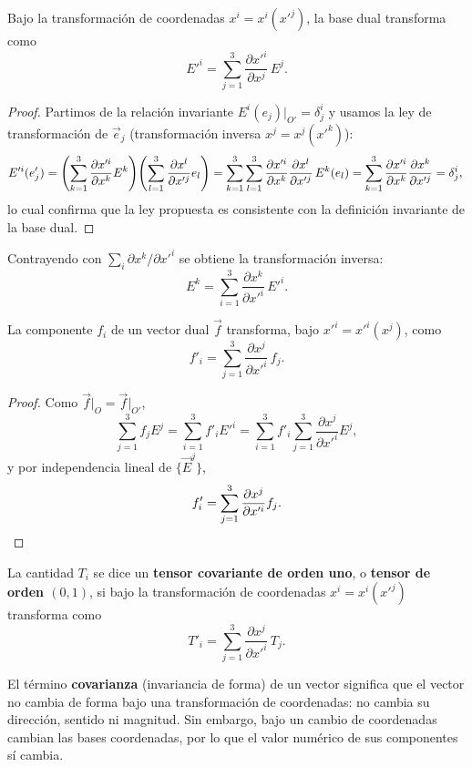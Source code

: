 \begin{proposicionc}
\label{prop:transf-base-dual}
Bajo la transformación de coordenadas $x^i=x^i(x'^j)$, la base dual
transforma como
\[
E'^i = \sum_{j=1}^{3} \frac{\partial x'^i}{\partial x^j}\, E^j .
\]
\end{proposicionc}

\begin{proof}
Partimos de la relación invariante $E^i(e_j)\big|_{O'} = \delta^i_j$ y
usamos la ley de transformación de $\vec e_j$ (transformación inversa
$x^j=x^j(x'^k)$):
\[
E'^i(e'_j) = \left(\sum_{k=1}^3 \frac{\partial x'^i}{\partial x^k} E^k
\right)\!\left(\sum_{l=1}^3 \frac{\partial x^l}{\partial x'^j} e_l\right)
= \sum_{k=1}^3\sum_{l=1}^3 \frac{\partial x'^i}{\partial x^k}
\frac{\partial x^l}{\partial x'^j}\, E^k(e_l)
= \sum_{k=1}^3 \frac{\partial x'^i}{\partial x^k}\frac{\partial
x^k}{\partial x'^j} = \delta^i_j , \qedhere
\]
lo cual confirma que la ley propuesta es consistente con la definición
invariante de la base dual.
\end{proof}

Contrayendo con $\sum_i \partial x^k/\partial x'^i$ se obtiene la
transformación inversa:
\[
E^k = \sum_{i=1}^{3} \frac{\partial x^k}{\partial x'^i}\, E'^i .
\]

\begin{proposicionc}
\label{prop:transf-componentes-dual}
La componente $f_i$ de un vector dual $\vec f$ transforma, bajo
$x'^i=x'^i(x^j)$, como
\[
f'_i = \sum_{j=1}^{3} \frac{\partial x^j}{\partial x'^i}\, f_j .
\]
\end{proposicionc}

\begin{proof}
Como $\vec f\big|_O = \vec f\big|_{O'}$,
\[
\sum_{j=1}^3 f_j E^j = \sum_{i=1}^3 f'_i E'^i = \sum_{i=1}^3 f'_i
\sum_{j=1}^3 \frac{\partial x^j}{\partial x'^i} E^j ,
\]
y por independencia lineal de $\{\vec E^j\}$,
\[
f'_i = \sum_{j=1}^3 \frac{\partial x^j}{\partial x'^i} f_j . \qedhere
\]
\end{proof}

\begin{definicion}
La cantidad $T_i$ se dice un \textbf{tensor covariante de orden uno}, o
\textbf{tensor de orden $(0,1)$}, si bajo la transformación de
coordenadas $x^i=x^i(x'^j)$ transforma como
\[
T'_i = \sum_{j=1}^{3} \frac{\partial x^j}{\partial x'^i}\, T_j .
\]
\end{definicion}

\begin{observacion}
El término \textbf{covarianza} (invariancia de forma) de un vector
significa que el vector no cambia de forma bajo una transformación de
coordenadas: no cambia su dirección, sentido ni magnitud. Sin embargo,
bajo un cambio de coordenadas cambian las bases coordenadas, por lo que
el valor numérico de sus componentes sí cambia.
\end{observacion}

